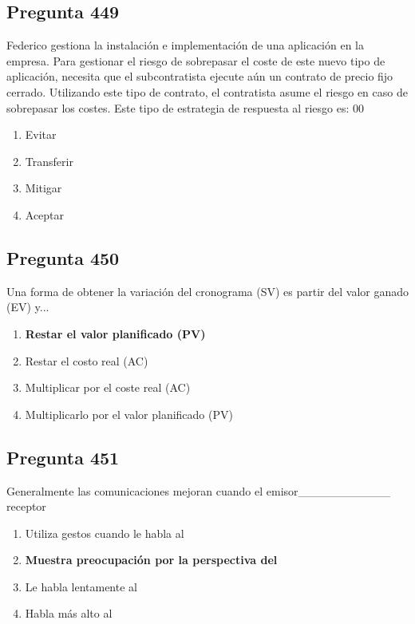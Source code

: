 \documentclass[11pt,a4paper]{article}
\begin{document}
\subsection*{Pregunta 449}
Federico gestiona la instalación e implementación de una aplicación en la empresa. Para gestionar el riesgo de sobrepasar el coste de este nuevo tipo de aplicación, necesita que el subcontratista ejecute aún un contrato de precio fijo cerrado. Utilizando este tipo de contrato, el contratista asume el riesgo en caso de sobrepasar los costes. Este tipo de estrategia de respuesta al riesgo es: 00

\begin{enumerate}[label=\alph*)]
  \item Evitar
  \item Transferir
  \item Mitigar
  \item Aceptar
\end{enumerate}

\subsection*{Pregunta 450}
Una forma de obtener la variación del cronograma (SV) es partir del valor ganado (EV) y...

\begin{enumerate}[label=\alph*)]
  \item \textbf{Restar el valor planificado (PV)}
  \item Restar el costo real (AC)
  \item Multiplicar por el coste real (AC)
  \item Multiplicarlo por el valor planificado (PV)
\end{enumerate}

\subsection*{Pregunta 451}
Generalmente las comunicaciones mejoran cuando el emisor\_\_\_\_\_\_\_\_\_\_\_ receptor

\begin{enumerate}[label=\alph*)]
  \item Utiliza gestos cuando le habla al
  \item \textbf{Muestra preocupación por la perspectiva del}
  \item Le habla lentamente al
  \item Habla más alto al
\end{enumerate}
\end{document}
